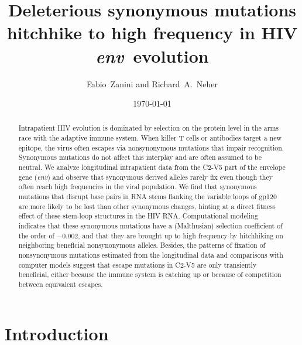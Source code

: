 \documentclass[rmp, twocolumn]{revtex4}
\newcommand{\env}{\textit{env}}
\newcommand{\shankaregion}{C2-V5}
\newcommand{\Author}{Fabio~Zanini and Richard~A.~Neher}
\newcommand{\Title}{Deleterious synonymous mutations hitchhike to high frequency in HIV \env~evolution}
\begin{document}
\title{\Title}
\author{\Author}
\date{\today}

\begin{abstract}
\noindent

Intrapatient HIV evolution is dominated by selection on the protein level in the
arms race with the adaptive immune system. When killer T cells or antibodies
target a new epitope, the virus often escapes via nonsynonymous mutations that
impair recognition. Synonymous mutations do not affect this interplay and are
often assumed to be neutral.
We analyze longitudinal intrapatient data from the \shankaregion{} part of the
envelope gene (\env{}) and observe that synonymous derived alleles rarely
fix even though they often reach high frequencies in the viral population.
We find that synonymous mutations that disrupt base pairs in RNA stems flanking
the variable loops of gp120 are more likely to be lost than other synonymous
changes, hinting at a direct fitness effect of these stem-loop structures in the
HIV RNA.
Computational modeling indicates that these synonymous mutations have a
(Malthusian) selection coefficient of the order of $-0.002$, and that they are
brought up to high frequency by hitchhiking on neighboring beneficial
nonsynonymous alleles.
Besides, the patterns of fixation of nonsynonymous mutations estimated from the
longitudinal data and comparisons with computer models
suggest that escape mutations in \shankaregion{} are only transiently
beneficial, either because the immune system is catching up or because of
competition between equivalent escapes.

\end{abstract}
\maketitle
\section{Introduction}
\end{document}
